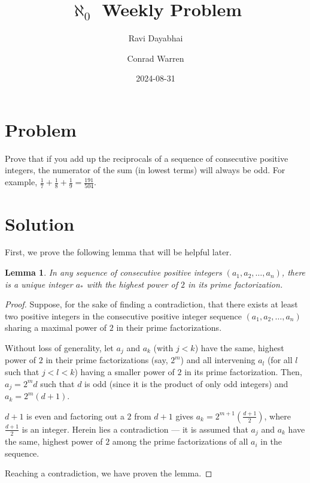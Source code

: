 \documentclass{article}
\title{$\aleph_{0}$ Weekly Problem}
\author{Ravi Dayabhai \and Conrad Warren}
\date{2024-08-31}
\newtheorem*{lemma}{Lemma}
\begin{document}
\maketitle

\section*{Problem}

Prove that if you add up the reciprocals of a sequence of consecutive positive integers, the numerator of the sum (in lowest terms) will always be odd. For example, $\frac{1}{7} + \frac{1}{8} + \frac{1}{9} = \frac{191}{504}$.

\section*{Solution}

First, we prove the following lemma that will be helpful later.

\begin{lemma}
  In any sequence of consecutive positive integers $(a_{1}, a_{2}, \ldots, a_{n})$, there is a unique integer $a_{*}$ with the highest power of $2$ in its prime factorization.
\end{lemma}

\begin{proof}
  Suppose, for the sake of finding a contradiction, that there exists at least two positive integers in the consecutive positive integer sequence $(a_{1}, a_{2}, \ldots, a_{n})$ sharing a maximal power of $2$ in their prime factorizations. 

  Without loss of generality, let $a_j$ and $a_k$ (with $j < k$) have the same, highest power of $2$ in their prime factorizations (say, $2^{m}$) and all intervening $a_l$ (for all $l$ such that $j < l < k$) having a smaller power of $2$ in its prime factorization.
  Then, $a_{j} = 2^{m}d$ such that $d$ is odd (since it is the product of only odd integers) and $a_{k} = 2^{m}(d + 1)$.

  $d+1$ is even and factoring out a $2$ from $d+1$ gives $a_{k} = 2^{m + 1} \left(\frac{d + 1}{2}\right)$, where $\frac{d + 1}{2}$ is an integer.
  Herein lies a contradiction --- it is assumed that $a_{j}$ and $a_{k}$ have the same, highest power of $2$ among the prime factorizations of all $a_i$ in the sequence.

  Reaching a contradiction, we have proven the lemma.
\end{proof}
 
\end{document}
